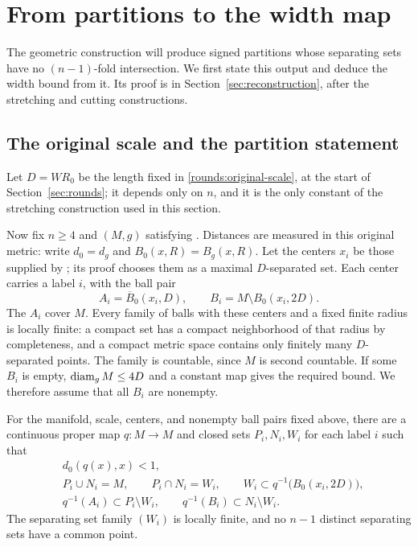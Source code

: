 \section{From partitions to the width map}\label{sec:width-map}

The geometric construction will produce signed partitions whose separating sets
have no $(n-1)$-fold intersection. We first state this output and deduce
the width bound from it. Its proof is in Section~\ref{sec:reconstruction},
after the stretching and cutting constructions.

\subsection{The original scale and the partition statement}

Let \(D=WR_0\) be the length fixed in \eqref{rounds:original-scale},
at the start of Section~\ref{sec:rounds}; it depends only on \(n\), and
it is the only constant of the stretching construction used in this
section.

Now fix $n\ge4$ and $(M,g)$ satisfying . Distances
are measured in this original metric: write $d_0=d_g$ and
$B_0(x,R)=B_g(x,R)$. Let the centers $x_i$ be those supplied by
; its proof chooses them as a maximal $D$-separated set. Each center carries a
label $i$, with the ball pair
\[
 A_i=\overline B_0(x_i,D),\qquad
 B_i=M\setminus B_0(x_i,2D).
\]
The $A_i$ cover $M$.  Every family of balls with these centers and a
fixed finite radius is locally finite: a compact set has a compact
neighborhood of that radius by completeness, and a compact metric
space contains only finitely many $D$-separated points.  The family is
countable, since $M$ is second countable.  If some $B_i$ is empty,
$\operatorname{diam}_{g}M\le 4D$ and a constant map gives the required bound.  We therefore
assume that all $B_i$ are nonempty.

\begin{proposition}\label{topology:partitions}
For the manifold, scale, centers, and nonempty ball pairs fixed above,
there are a continuous proper map $q:M\to M$ and closed sets
$P_i,N_i,W_i$ for each label $i$ such that
\begin{align}
 &d_0(q(x),x)<1,\label{topology:displacement}\\
 &P_i\cup N_i=M,\qquad P_i\cap N_i=W_i,
   \qquad W_i\subset q^{-1}\bigl(B_0(x_i,2D)\bigr),
   \label{topology:sides}\\
 &q^{-1}(A_i)\subset P_i\setminus W_i,
   \qquad q^{-1}(B_i)\subset N_i\setminus W_i.
   \label{topology:forced}
\end{align}
The separating set family $(W_i)$ is locally finite, and no $n-1$ distinct separating sets
have a common point.
\end{proposition}

